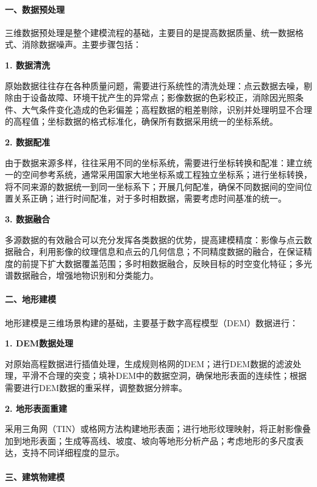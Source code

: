 \paragraph{一、数据预处理}\label{ux4e00ux6570ux636eux9884ux5904ux7406}

三维数据预处理是整个建模流程的基础，主要目的是提高数据质量、统一数据格式、消除数据噪声。主要步骤包括：

\textbf{1. 数据清洗}

原始数据往往存在各种质量问题，需要进行系统性的清洗处理：点云数据去噪，剔除由于设备故障、环境干扰产生的异常点；影像数据的色彩校正，消除因光照条件、大气条件变化造成的色彩偏差；高程数据的粗差剔除，识别并处理明显不合理的高程值；坐标数据的格式标准化，确保所有数据采用统一的坐标系统。

\textbf{2. 数据配准}

由于数据来源多样，往往采用不同的坐标系统，需要进行坐标转换和配准：建立统一的空间参考系统，通常采用国家大地坐标系或工程独立坐标系；进行坐标转换，将不同来源的数据统一到同一坐标系下；开展几何配准，确保不同数据间的空间位置关系正确；进行时间配准，对于多时相数据，需要考虑时间基准的统一。

\textbf{3. 数据融合}

多源数据的有效融合可以充分发挥各类数据的优势，提高建模精度：影像与点云数据融合，利用影像的纹理信息和点云的几何信息；不同精度数据的融合，在保证精度的前提下扩大数据覆盖范围；多时相数据融合，反映目标的时空变化特征；多光谱数据融合，增强地物识别和分类能力。

\paragraph{二、地形建模}\label{ux4e8cux5730ux5f62ux5efaux6a21}

地形建模是三维场景构建的基础，主要基于数字高程模型（DEM）数据进行：

\textbf{1. DEM数据处理}

对原始高程数据进行插值处理，生成规则格网的DEM；进行DEM数据的滤波处理，平滑不合理的突变；填补DEM中的数据空洞，确保地形表面的连续性；根据需要进行DEM数据的重采样，调整数据分辨率。

\textbf{2. 地形表面重建}

采用三角网（TIN）或格网方法构建地形表面；进行地形纹理映射，将正射影像叠加到地形表面；生成等高线、坡度、坡向等地形分析产品；考虑地形的多尺度表达，支持不同详细程度的显示。

\paragraph{三、建筑物建模}\label{ux4e09ux5efaux7b51ux7269ux5efaux6a21}

